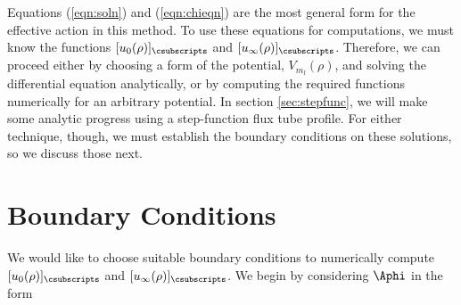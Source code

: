 % 
% 

% 
% 

Equations (\ref{eqn:soln}) and (\ref{eqn:chieqn}) are the most general form for the 
effective action in this method. To use these equations for computations, we must know the 
functions $[u_0(\rho)]_{\csubscripts}$ and $[u_\infty(\rho)]_{\csubscripts}$. Therefore, 
we can proceed either by choosing a form of the potential, $V_{m_l}(\rho)$, and 
solving the differential equation analytically, or by computing the required functions 
numerically for an arbitrary potential. In section \ref{sec:stepfunc}, we will 
make some analytic progress using a step-function flux tube profile. For either 
technique, though, we must establish the boundary conditions on these solutions, 
so we discuss those next.



\section{Boundary Conditions}
We would like to choose suitable boundary conditions to numerically 
compute $[u_0(\rho)]_{\csubscripts}$ and $[u_\infty(\rho)]_{\csubscripts}$.  We begin by 
considering $\Aphi$ in the form

